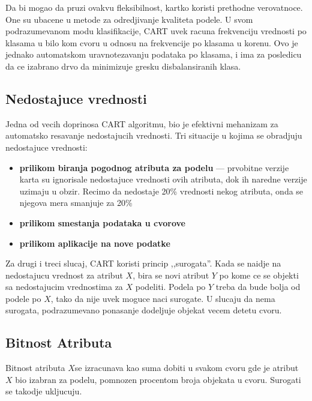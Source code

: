 \documentclass[a4paper]{article}
\begin{document}
Da bi mogao da pruzi ovakvu fleksibilnost, kartko koristi prethodne verovatnoce. One su ubacene u
metode za odredjivanje kvaliteta podele. U svom podrazumevanom modu klasifikacije, CART uvek racuna
frekvenciju vrednosti po klasama u bilo kom cvoru u odnosu na frekvencije po klasama u korenu. Ovo
je jednako automatskom uravnotezavanju podataka po klasama, i ima za posledicu da ce izabrano drvo
da minimizuje gresku disbalansiranih klasa.

\subsection{Nedostajuce vrednosti}
Jedna od vecih doprinosa CART algoritmu, bio je efektivni mehanizam za automatsko resavanje
nedostajucih vrednosti. Tri situacije u kojima se obradjuju nedostajuce vrednosti:
\begin{itemize}
    \item \textbf{prilikom biranja pogodnog atributa za podelu} --- prvobitne verzije karta su
        ignorisale nedostajuce vrednosti ovih atributa, dok ih naredne verzije uzimaju u obzir.
        Recimo da nedostaje 20\% vrednosti nekog atributa, onda se njegova mera smanjuje za 20\%
    \item \textbf{prilikom smestanja podataka u cvorove}
    \item \textbf{prilikom aplikacije na nove podatke}
\end{itemize}

Za drugi i treci slucaj, CART koristi princip ,,surogata''. Kada se naidje na nedostajucu vrednost
za atribut \(X\), bira se novi atribut \(Y\) po kome ce se objekti sa nedostajucim vrednostima za
\(X\) podeliti. Podela po \(Y\) treba da bude bolja od podele po \(X\), tako da nije uvek moguce
naci surogate. U slucaju da nema surogata, podrazumevano ponasanje dodeljuje objekat vecem detetu
cvoru.

\subsection{Bitnost Atributa}
Bitnost atributa \(X\)se izracunava kao suma dobiti u svakom cvoru gde je atribut \(X\) bio izabran
za podelu, pomnozen procentom broja objekata u cvoru. Surogati se takodje ukljucuju.
\end{document}
